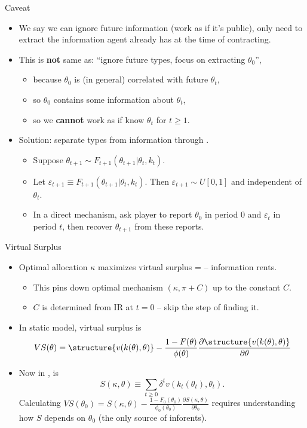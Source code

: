 \documentclass[english,10pt
,aspectratio=169
]{beamer}
\begin{document}
\begin{frame}{Caveat}
\begin{itemize}
	\item We say we can ignore future information (work as if it's public), only need to extract the information agent already has at the time of contracting.
	\item This is \textbf{not} same as: ``ignore future types, focus on extracting $\theta_0$'',
	\begin{itemize}
		\item because $\theta_0$ is (in general) correlated with future $\theta_t$,
		\item so $\theta_0$ contains some information about $\theta_t$,
		\item so we \textbf{cannot} work as if know $\theta_t$ for $t \geq 1$.
	\end{itemize}
	\item Solution: separate \alert{types} from \alert{information} through .
	\begin{itemize}
		\item Suppose $\theta_{t+1} \sim F_{t+1} (\theta_{t+1} | \theta_t, k_t)$.
		\item Let $\varepsilon_{t+1} \equiv F_{t+1} (\theta_{t+1} | \theta_t, k_t)$. Then $\varepsilon_{t+1} \sim U[0,1]$ and independent of $\theta_t$.
		\item In a direct mechanism, ask player to report $\theta_0$ in period $0$ and $\varepsilon_{t}$ in period $t$, then recover $\theta_{t+1}$ from these reports.
	\end{itemize}
\end{itemize}
\end{frame}


\begin{frame}{Virtual Surplus}
\begin{itemize}
	\item Optimal allocation $\kappa$ maximizes \alert{virtual surplus} =  -- information rents.
	\begin{itemize}
		\item This pins down optimal mechanism $(\kappa,\pi+C)$ up to the constant $C$.
		\item $C$ is determined from IR at $t=0$ -- skip the step of finding it.
	\end{itemize}
	\item In \alert{static} model, \alert{virtual surplus} is
	$$ VS(\theta) = \structure{v(k(\theta),\theta)} - \frac{1-F(\theta)}{\phi(\theta)} \frac{\partial \structure{v(k(\theta),\theta)}}{\partial \theta} $$
	\item Now in ,  is $$S(\kappa,\theta) \equiv \sum_{t\geq 0} \delta^t v(k_t(\theta_t),\theta_t).$$ 
	Calculating $VS(\theta_0) = S(\kappa,\theta) - \frac{1-F_0(\theta_0)}{\phi_0(\theta_0)} \frac{\partial S(\kappa,\theta)}{\partial \theta_0}$ requires understanding how $S$ depends on $\theta_0$ (the only source of inforents).
\end{itemize}
\end{frame}
\end{document}
